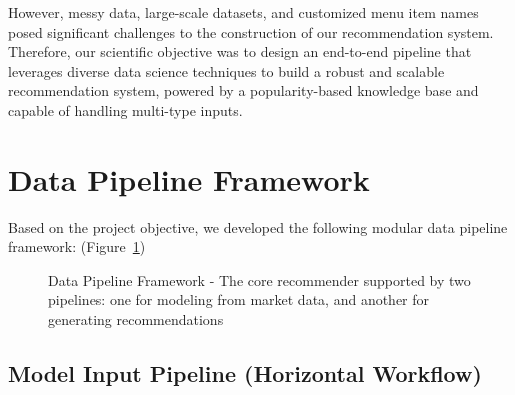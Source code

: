 \documentclass[
  11pt,
  a4paper,
  DIV=11,
  numbers=noendperiod]{scrartcl}
\begin{document}
However, messy data, large-scale datasets, and customized menu item
names posed significant challenges to the construction of our
recommendation system. Therefore, our scientific objective was to design
an end-to-end pipeline that leverages diverse data science techniques to
build a robust and scalable recommendation system, powered by a
popularity-based knowledge base and capable of handling multi-type
inputs.

\newpage

\section{Data Pipeline Framework}\label{data-pipeline-framework}

Based on the project objective, we developed the following modular data
pipeline framework: (Figure~\ref{fig-data-pipeline-overview})

\begin{figure}

\caption{\label{fig-data-pipeline-overview}Data Pipeline Framework - The
core recommender supported by two pipelines: one for modeling from
market data, and another for generating recommendations}


\end{figure}%

\subsection{Model Input Pipeline (Horizontal
Workflow)}\label{model-input-pipeline-horizontal-workflow}
\end{document}
